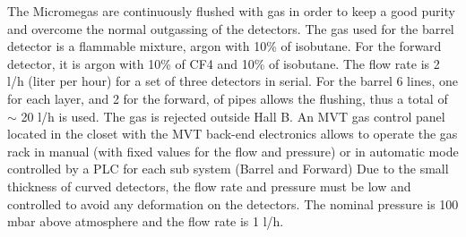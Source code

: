 The Micromegas are continuously flushed with gas in order to keep a good purity and overcome the normal outgassing of the detectors. The gas used for the barrel detector is a flammable mixture, argon with 10\% of isobutane. For the forward detector, it is argon with 10\% of CF4 and 10\% of isobutane. The flow rate is 2 l/h (liter per hour) for a set of three detectors in serial. For the barrel 6 lines, one for each layer, and 2 for the forward, of pipes allows the flushing, thus a total of $\sim$ 20 l/h is used.  The gas is rejected outside Hall B. An MVT gas control panel located in the closet with the MVT back-end electronics allows to operate the gas rack in manual (with fixed values for the flow and pressure) or in automatic mode controlled by a PLC for each sub system (Barrel and Forward) Due to the small thickness of curved detectors, the flow rate and pressure must be low and controlled to avoid any deformation on the detectors. The nominal pressure is 100 mbar above atmosphere and the flow rate is 1 l/h.